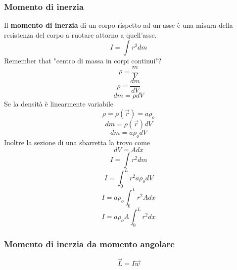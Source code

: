 \documentclass[twoside]{article}
\begin{document}
\subsubsection{Momento di inerzia}
Il \textbf{momento di inerzia} di un corpo rispetto ad un asse è una misura della resistenza del corpo a ruotare attorno a quell'asse.\\
\begin{equation*}
  \boxed{I = \int r^2 dm}
\end{equation*}
Remember that "centro di massa in corpi continui"?
\begin{equation*}
  \rho = \frac{m}{V}
\end{equation*}
\begin{equation*}
  \rho = \frac{dm}{dV}
\end{equation*}
\begin{equation*}
  dm = \rho dV
\end{equation*}
Se la densità è linearmente variabile
\begin{equation*}
  \rho = \rho(\vec{r}) = a \rho_o
\end{equation*}
\begin{equation*}
  dm = \rho(\vec{r}) dV
\end{equation*}
\begin{equation*}
  dm = a \rho_o dV
\end{equation*}
Inoltre la sezione di una sbarretta la trovo come
\begin{equation*}
  dV = A dx
\end{equation*}
\begin{equation*}
  I = \int r^2 dm
\end{equation*}
\begin{equation*}
  I = \int_{0}^{L} r^2 a \rho_o dV
\end{equation*}
\begin{equation*}
  I = a \rho_o \int_{0}^{L} r^2 A dx
\end{equation*}
\begin{equation*}
  I = a \rho_o A \int_{0}^{L} r^2 dx
\end{equation*}
\subsubsection{Momento di inerzia da momento angolare}
\begin{equation}
  \boxed{\vec{L} = I \vec{w}}
\end{equation}
\end{document}
